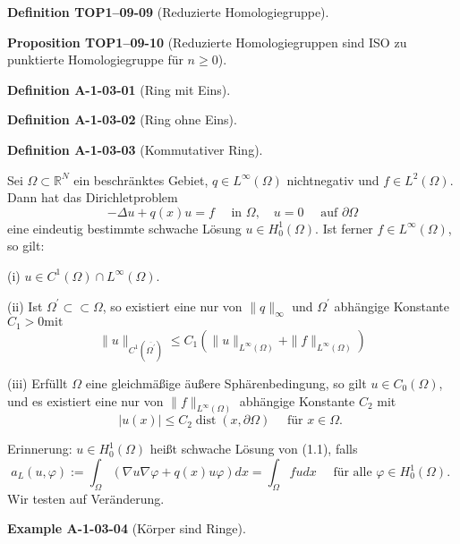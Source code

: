 \documentclass[10pt, letterpaper]{article}
\newcommand{\CustomHeading}[3]{%
  \par\medskip\noindent%
  \textbf{#1 #2} \textnormal{(#3)}.\enskip%
}
\newenvironment{DEF}[2]{\CustomHeading{Definition}{#1}{#2}}{}
\newenvironment{PROP}[2]{\CustomHeading{Proposition}{#1}{#2}}{}
\newenvironment{EXA}[2]{\CustomHeading{Example}{#1}{#2}}{}
\begin{document}
\begin{DEF}{TOP1--09-09}{Reduzierte Homologiegruppe}
\end{DEF}

\begin{PROP}{TOP1--09-10}{Reduzierte Homologiegruppen sind ISO zu punktierte Homologiegruppe für $n\geq 0$}
\end{PROP}

\begin{DEF}{A-1-03-01}{Ring mit Eins}
\end{DEF}

\begin{DEF}{A-1-03-02}{Ring ohne Eins}
\end{DEF}

\begin{DEF}{A-1-03-03}{Kommutativer Ring}
Sei $\Omega \subset \mathbb{R}^{N}$ ein beschränktes Gebiet, $q \in L^{\infty}(\Omega)$ nichtnegativ und $f \in L^{2}(\Omega)$. Dann hat das Dirichletproblem
$$
-\Delta u+q(x) u=f \quad \text { in } \Omega, \quad u=0 \quad \text { auf } \partial \Omega
$$
eine eindeutig bestimmte schwache Lösung $u \in H_{0}^{1}(\Omega)$. Ist ferner $f \in L^{\infty}(\Omega)$, so gilt:

(i) $u \in C^{1}(\Omega) \cap L^{\infty}(\Omega)$.

(ii) Ist $\Omega^{\prime} \subset \subset \Omega$, so existiert eine nur von $\|q\|_{\infty}$ und $\Omega^{\prime}$ abhängige Konstante $C_{1}>0 \mathrm{mit}$
$$
\|u\|_{C^{1}\left(\overline{\Omega^{\prime}}\right)} \leq C_{1}\left(\|u\|_{L^{\infty}(\Omega)}+\|f\|_{L^{\infty}(\Omega)}\right)
$$

(iii) Erfüllt $\Omega$ eine gleichmäßige äußere Sphärenbedingung, so gilt $u \in C_{0}(\Omega)$, und es existiert eine nur von $\|f\|_{L^{\infty}(\Omega)}$ abhängige Konstante $C_{2}$ mit
$$
|u(x)| \leq C_{2} \operatorname{dist}(x, \partial \Omega) \quad \text { für } x \in \Omega \text {. }
$$

Erinnerung: $u \in H_{0}^{1}(\Omega)$ heißt schwache Lösung von (1.1), falls
$$
a_{L}(u, \varphi):=\int_{\Omega}(\nabla u \nabla \varphi+q(x) u \varphi) d x=\int_{\Omega} f u d x \quad \text { für alle } \varphi \in H_{0}^{1}(\Omega) \text {. }
$$
Wir testen auf Veränderung.
\end{DEF}

\begin{EXA}{A-1-03-04}{Körper sind Ringe}
\end{EXA}
\end{document}
